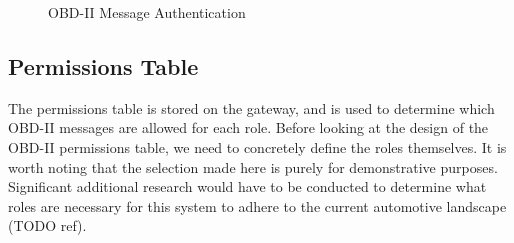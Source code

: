 \begin{figure}[h]
	\centering
	\caption{OBD-II Message Authentication}
	\label{fig:message_authentication}
\end{figure}

\subsection{Permissions Table} 
\label{subsec:sol_permissions_table}
The permissions table is stored on the gateway, and is used to determine which OBD-II messages are allowed for each role. Before looking at the design of the OBD-II permissions table, we need to concretely define the roles themselves. It is worth noting that the selection made here is purely for demonstrative purposes. Significant additional research would have to be conducted to determine what roles are necessary for this system to adhere to the current automotive landscape (TODO ref).

